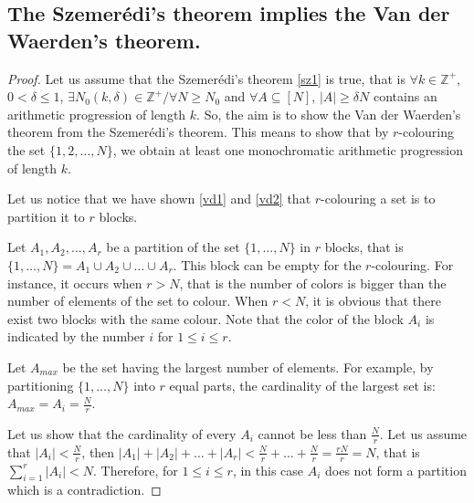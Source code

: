\subsection{The Szemerédi's theorem implies the Van der Waerden's theorem.} \label{vsz}

\begin{proof}
  Let us assume that the Szemerédi's theorem \eqref{sz1} is true, that is $\forall k \in \mathbb{Z}^+$, $0< \delta \leq  1$, $\exists N_0(k,\delta) \in \mathbb{Z}^+/ \forall N \geq N_0$ and $ \forall A \subseteq [N]$, $|A|\geq \delta N$ contains an arithmetic progression of length $k.$ So, the aim is to show the  Van der Waerden's theorem from the Szemerédi's theorem. This means to  show that by $r$-colouring the set $\{1,2,\ldots, N\}$, we obtain at least one monochromatic arithmetic progression of length $k.$
  
   Let us notice that we have shown \eqref{vd1} and \eqref{vd2} that $r$-colouring a set  is to partition it to $r$ blocks.

   Let $A_1,A_2, \ldots, A_r$ be a partition of the set $\{1, \ldots, N\}$ in $r$ blocks, that is $ \{1, \ldots, N\} =A_1 \cup A_2 \cup \ldots \cup A_r$. This block can be empty for the $r$-colouring. For instance, it occurs when $r >N$, that is the number of colors is bigger than the number of elements of the set to colour. When $r <N$, it is obvious that there exist two blocks with the same colour. Note that the color of the block $A_i$ is indicated  by the number $i$  for $1\leq i \leq r.$ 

Let $A_{max}$ be the set having the largest number of elements. For example, by partitioning $\{1, \ldots, N\}$ into $r$ equal parts, the cardinality of the largest set is: $A_{max}=A_i=\frac{N}{r}$.

  Let us show that the cardinality of every $A_i$  cannot be less than $\frac{N}{r}$.
  Let us assume that  $|A_i| < \frac{N}{r}$,  then $|A_1|+|A_2|+ \ldots +|A_r| < \frac{N}{r}+\ldots +\frac{N}{r}=\frac{rN}{r}=N$,
 that is $\displaystyle{ \sum_{i=1}^{r}|A_i|<N}$. Therefore, for $1\leq i \leq r$, in this case $A_i$ does not form a partition which is a contradiction.


\end{proof}
